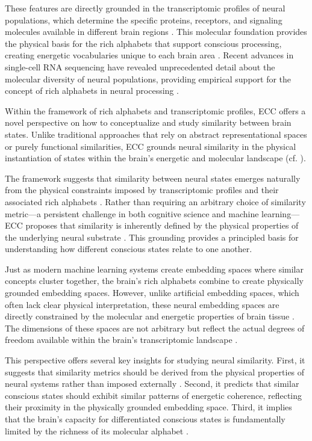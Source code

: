 These features are directly grounded in the transcriptomic profiles of neural populations, which determine the specific proteins, receptors, and signaling molecules available in different brain regions \cite{saunders2018molecular}. This molecular foundation provides the physical basis for the rich alphabets that support conscious processing, creating energetic vocabularies unique to each brain area \cite{yuste2020community}. Recent advances in single-cell RNA sequencing have revealed unprecedented detail about the molecular diversity of neural populations, providing empirical support for the concept of rich alphabets in neural processing \cite{macosko2015highly, zeisel2015cell}.

Within the framework of rich alphabets and transcriptomic profiles, ECC offers a novel perspective on how to conceptualize and study similarity between brain states. Unlike traditional approaches that rely on abstract representational spaces or purely functional similarities, ECC grounds neural similarity in the physical instantiation of states within the brain's energetic and molecular landscape (cf. \cite{bobadilla-suarez2020measures}).

The framework suggests that similarity between neural states emerges naturally from the physical constraints imposed by transcriptomic profiles and their associated rich alphabets \cite{thompson2014human}. Rather than requiring an arbitrary choice of similarity metric—a persistent challenge in both cognitive science and machine learning—ECC proposes that similarity is inherently defined by the physical properties of the underlying neural substrate \cite{trapnell2015defining}. This grounding provides a principled basis for understanding how different conscious states relate to one another.

Just as modern machine learning systems create embedding spaces where similar concepts cluster together, the brain's rich alphabets combine to create physically grounded embedding spaces. However, unlike artificial embedding spaces, which often lack clear physical interpretation, these neural embedding spaces are directly constrained by the molecular and energetic properties of brain tissue \cite{wang2018three}. The dimensions of these spaces are not arbitrary but reflect the actual degrees of freedom available within the brain's transcriptomic landscape \cite{tasic2018shared}.

This perspective offers several key insights for studying neural similarity. First, it suggests that similarity metrics should be derived from the physical properties of neural systems rather than imposed externally \cite{bakken2021comparative}. Second, it predicts that similar conscious states should exhibit similar patterns of energetic coherence, reflecting their proximity in the physically grounded embedding space. Third, it implies that the brain's capacity for differentiated conscious states is fundamentally limited by the richness of its molecular alphabet \cite{cembrowski2018continuous}.

